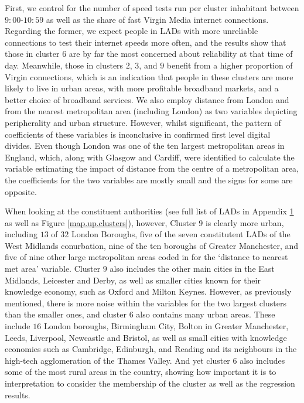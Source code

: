 \documentclass[]{interact}
\theoremstyle{plain}%
\theoremstyle{definition}
\theoremstyle{remark}
\begin{document}
First, we control for the number of speed tests run per cluster
inhabitant between \(9:00\)-\(10:59\) as well as the share of fast
Virgin Media internet connections. Regarding the former, we expect
people in LADs with more unreliable connections to test their internet
speeds more often, and the results show that those in cluster \(6\) are
by far the most concerned about reliability at that time of day.
Meanwhile, those in clusters \(2\), \(3\), and \(9\) benefit from a
higher proportion of Virgin connections, which is an indication that
people in these clusters are more likely to live in urban areas, with
more profitable broadband markets, and a better choice of broadband
services. We also employ distance from London and from the nearest
metropolitan area (including London) as two variables depicting
peripherality and urban structure. However, whilst significant, the
pattern of coefficients of these variables is inconclusive in confirmed
first level digital divides. Even though London was one of the ten
largest metropolitan areas in England, which, along with Glasgow and
Cardiff, were identified to calculate the variable estimating the impact
of distance from the centre of a metropolitan area, the coefficients for
the two variables are mostly small and the signs for some are opposite.

When looking at the constituent authorities (see full list of LADs in
Appendix \protect\hyperlink{appendix1}{1} as well as Figure
\ref{map.up.clusters}), however, Cluster \(9\) is clearly more urban,
including \(13\) of \(32\) London Boroughs, five of the seven
constitutent LADs of the West Midlands conurbation, nine of the ten
boroughs of Greater Manchester, and five of nine other large
metropolitan areas coded in for the `distance to nearest met area'
variable. Cluster \(9\) also includes the other main cities in the East
Midlands, Leicester and Derby, as well as smaller cities known for their
knowledge economy, such as Oxford and Milton Keynes. However, as
previously mentioned, there is more noise within the variables for the
two largest clusters than the smaller ones, and cluster \(6\) also
contains many urban areas. These include \(16\) London boroughs,
Birmingham City, Bolton in Greater Manchester, Leeds, Liverpool,
Newcastle and Bristol, as well as small cities with knowledge economies
such as Cambridge, Edinburgh, and Reading and its neighbours in the
high-tech agglomeration of the Thames Valley. And yet cluster \(6\) also
includes some of the most rural areas in the country, showing how
important it is to interpretation to consider the membership of the
cluster as well as the regression results.
\end{document}
